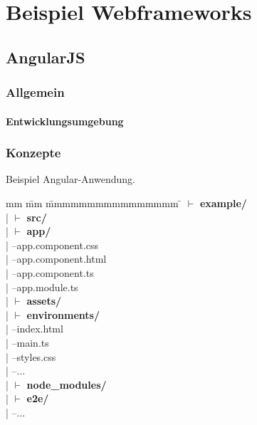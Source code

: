 
\chapter{Beispiel Webframeworks}

\section{AngularJS}

\subsection{Allgemein}

\subsubsection{}


\subsubsection{Entwicklungsumgebung}


\subsection{Konzepte}

Beispiel Angular-Anwendung.

\begin{tabbing}
	mm \= mm \= mmmmmmmmmmmmmmmm \= \kill
	$\vdash$ \textbf{example/} \\ 
	| \> $\vdash$ \textbf{src/}\\ 
	| \> \> $\vdash$  \textbf{app/}\\
	| \> \>  --app.component.css\\
	| \> \>  --app.component.html\\
	| \> \>  --app.component.ts\\
	| \> \>  --app.module.ts\\
	| \> \> $\vdash$ \textbf{assets/} \\
	| \> \> $\vdash$ \textbf{environments/} \\
	| \> --index.html \\
	| \> --main.ts \\
	| \> --styles.css \\
	| \> --... \\
	| \> $\vdash$ \textbf{node\_modules/}\\ 
	| \> $\vdash$ \textbf{e2e/}\\   
	| --...\\
\end{tabbing}

